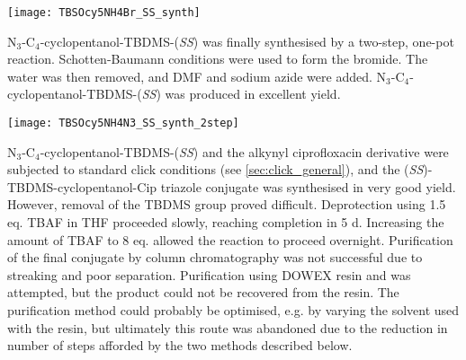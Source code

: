 \begin{scheme}[H]
	\begin{center}
		\texttt{[image: TBSOcy5NH4Br\_SS\_synth]}
		\caption{Attempted synthesis of Br-C$_4$-cyclopentanol-TBDMS-(\textit{SS}) . 
		a) , , water, 0 $^{\circ}$C, 2 h. %
		\label{sch:TBSOcy5NH4Br_SS_synth}}
	\end{center}
\end{scheme}


N$_3$-C$_4$-cyclopentanol-TBDMS-(\textit{SS})  was finally synthesised by a two-step, one-pot reaction. Schotten-Baumann conditions were used to form the bromide. The water was then removed, and DMF and sodium azide were added. N$_3$-C$_4$-cyclopentanol-TBDMS-(\textit{SS})  was produced in excellent yield.

\begin{scheme}[H]
	\begin{center}
				
		\texttt{[image: TBSOcy5NH4N3\_SS\_synth\_2step]}
		\caption{
		Synthesis of N$_3$-C$_4$-cyclopentanol-TBDMS-(\textit{SS}) .
		a) , , water, 0 $^{\circ}$C, 3 h.
		b) , DMF, , r.t., 3 h. 
		99\% over 2 steps. %
		\label{sch:TBSOcy5NH4N3_SS_synth_2step}}
	\end{center}
\end{scheme}


N$_3$-C$_4$-cyclopentanol-TBDMS-(\textit{SS})  and the alkynyl ciprofloxacin derivative  were subjected to standard click conditions (see \ref{sec:click_general}), and the (\textit{SS})-TBDMS-cyclopentanol-Cip triazole conjugate  was synthesised in very good yield. However, removal of the TBDMS group proved difficult. Deprotection using 1.5 eq. TBAF in THF proceeded slowly, reaching completion in 5 d. Increasing the amount of TBAF to 8 eq. allowed the reaction to proceed overnight.
Purification of the final conjugate  by column chromatography was not successful due to streaking and poor separation. Purification using DOWEX resin and \cite{Kaburagi2007} was attempted, but the product could not be recovered from the resin.
The purification method could probably be optimised, e.g. by varying the solvent used with the resin, but ultimately this route was abandoned due to the reduction in number of steps afforded by the two methods described below.

